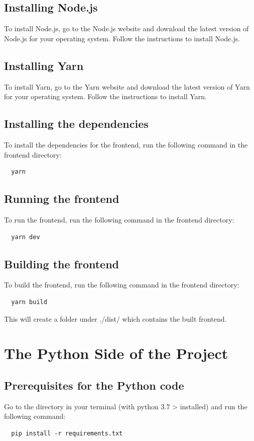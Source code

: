 \documentclass[]{final_report}
\begin{document}
\subsection{Installing Node.js}
To install Node.js\cite{NodeJs}, go to the Node.js website and download the latest version of Node.js for your operating system. 
Follow the instructions to install Node.js.

\subsection{Installing Yarn}
To install Yarn\cite{Yarn}, go to the Yarn website and download the latest version of Yarn for your operating system.
Follow the instructions to install Yarn.

\subsection{Installing the dependencies}
To install the dependencies for the frontend, run the following command in the frontend directory:
\begin{lstlisting}
  yarn
\end{lstlisting}

\subsection{Running the frontend}
To run the frontend, run the following command in the frontend directory:
\begin{lstlisting}
  yarn dev
\end{lstlisting}

\subsection{Building the frontend}
To build the frontend, run the following command in the frontend directory:
\begin{lstlisting}
  yarn build
\end{lstlisting}

This will create a folder under ./dist/ which contains the built frontend.

\section{The Python Side of the Project}

\subsection{Prerequisites for the Python code}
Go to the directory in your terminal (with python 3.7 > installed) and run the following command:
\begin{lstlisting}
  pip install -r requirements.txt
\end{lstlisting}
\end{document}
